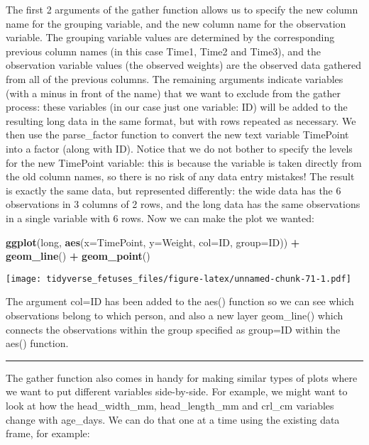 \documentclass[
]{article}
\newenvironment{Shaded}{\begin{snugshade}}{\end{snugshade}}
\newcommand{\DataTypeTok}[1]{\textcolor[rgb]{0.13,0.29,0.53}{#1}}
\newcommand{\KeywordTok}[1]{\textcolor[rgb]{0.13,0.29,0.53}{\textbf{#1}}}
\newcommand{\NormalTok}[1]{#1}
\newcommand{\OperatorTok}[1]{\textcolor[rgb]{0.81,0.36,0.00}{\textbf{#1}}}
\newcommand{\StringTok}[1]{\textcolor[rgb]{0.31,0.60,0.02}{#1}}
\begin{document}
The first 2 arguments of the gather function allows us to specify the
new column name for the grouping variable, and the new column name for
the observation variable. The grouping variable values are determined by
the corresponding previous column names (in this case Time1, Time2 and
Time3), and the observation variable values (the observed weights) are
the observed data gathered from all of the previous columns. The
remaining arguments indicate variables (with a minus in front of the
name) that we want to exclude from the gather process: these variables
(in our case just one variable: ID) will be added to the resulting long
data in the same format, but with rows repeated as necessary. We then
use the parse\_factor function to convert the new text variable
TimePoint into a factor (along with ID). Notice that we do not bother to
specify the levels for the new TimePoint variable: this is because the
variable is taken directly from the old column names, so there is no
risk of any data entry mistakes! The result is exactly the same data,
but represented differently: the wide data has the 6 observations in 3
columns of 2 rows, and the long data has the same observations in a
single variable with 6 rows. Now we can make the plot we wanted:

\begin{Shaded}
\begin{Highlighting}[]
\KeywordTok{ggplot}\NormalTok{(long, }\KeywordTok{aes}\NormalTok{(}\DataTypeTok{x=}\NormalTok{TimePoint, }\DataTypeTok{y=}\NormalTok{Weight, }\DataTypeTok{col=}\NormalTok{ID, }\DataTypeTok{group=}\NormalTok{ID)) }\OperatorTok{+}
\StringTok{    }\KeywordTok{geom_line}\NormalTok{() }\OperatorTok{+}
\StringTok{    }\KeywordTok{geom_point}\NormalTok{()}
\end{Highlighting}
\end{Shaded}

\texttt{[image: tidyverse\_fetuses\_files/figure-latex/unnamed-chunk-71-1.pdf]}

The argument col=ID has been added to the aes() function so we can see
which observations belong to which person, and also a new layer
geom\_line() which connects the observations within the group specified
as group=ID within the aes() function.

\begin{center}\rule{0.5\linewidth}{0.5pt}\end{center}

The gather function also comes in handy for making similar types of
plots where we want to put different variables side-by-side. For
example, we might want to look at how the head\_width\_mm,
head\_length\_mm and crl\_cm variables change with age\_days. We can do
that one at a time using the existing data frame, for example:
\end{document}
